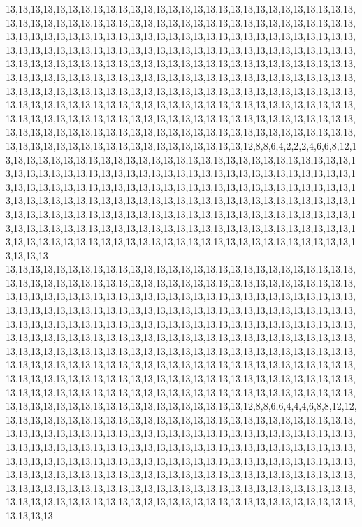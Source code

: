 13,13,13,13,13,13,13,13,13,13,13,13,13,13,13,13,13,13,13,13,13,13,13,13,13,13,13,13,13,13,13,13,13,13,13,13,13,13,13,13,13,13,13,13,13,13,13,13,13,13,13,13,13,13,13,13,13,13,13,13,13,13,13,13,13,13,13,13,13,13,13,13,13,13,13,13,13,13,13,13,13,13,13,13,13,13,13,13,13,13,13,13,13,13,13,13,13,13,13,13,13,13,13,13,13,13,13,13,13,13,13,13,13,13,13,13,13,13,13,13,13,13,13,13,13,13,13,13,13,13,13,13,13,13,13,13,13,13,13,13,13,13,13,13,13,13,13,13,13,13,13,13,13,13,13,13,13,13,13,13,13,13,13,13,13,13,13,13,13,13,13,13,13,13,13,13,13,13,13,13,13,13,13,13,13,13,13,13,13,13,13,13,13,13,13,13,13,13,13,13,13,13,13,13,13,13,13,13,13,13,13,13,13,13,13,13,13,13,13,13,13,13,13,13,13,13,13,13,13,13,13,13,13,13,13,13,13,13,13,13,13,13,13,13,13,13,13,13,13,13,13,13,13,13,13,13,13,13,13,13,13,13,13,13,13,13,13,13,13,13,13,13,13,13,13,13,13,13,13,13,13,13,13,13,13,13,13,13,13,13,13,13,13,13,13,13,13,13,13,12,8,8,6,4,2,2,2,4,6,6,8,12,13,13,13,13,13,13,13,13,13,13,13,13,13,13,13,13,13,13,13,13,13,13,13,13,13,13,13,13,13,13,13,13,13,13,13,13,13,13,13,13,13,13,13,13,13,13,13,13,13,13,13,13,13,13,13,13,13,13,13,13,13,13,13,13,13,13,13,13,13,13,13,13,13,13,13,13,13,13,13,13,13,13,13,13,13,13,13,13,13,13,13,13,13,13,13,13,13,13,13,13,13,13,13,13,13,13,13,13,13,13,13,13,13,13,13,13,13,13,13,13,13,13,13,13,13,13,13,13,13,13,13,13,13,13,13,13,13,13,13,13,13,13,13,13,13,13,13,13,13,13,13,13,13,13,13,13,13,13,13,13,13,13,13,13,13,13,13,13,13,13,13,13,13,13,13,13,13,13,13,13,13,13,13,13,13,13,13,13,13,13,13,13,13,13,13,13,13,13,13,13
13,13,13,13,13,13,13,13,13,13,13,13,13,13,13,13,13,13,13,13,13,13,13,13,13,13,13,13,13,13,13,13,13,13,13,13,13,13,13,13,13,13,13,13,13,13,13,13,13,13,13,13,13,13,13,13,13,13,13,13,13,13,13,13,13,13,13,13,13,13,13,13,13,13,13,13,13,13,13,13,13,13,13,13,13,13,13,13,13,13,13,13,13,13,13,13,13,13,13,13,13,13,13,13,13,13,13,13,13,13,13,13,13,13,13,13,13,13,13,13,13,13,13,13,13,13,13,13,13,13,13,13,13,13,13,13,13,13,13,13,13,13,13,13,13,13,13,13,13,13,13,13,13,13,13,13,13,13,13,13,13,13,13,13,13,13,13,13,13,13,13,13,13,13,13,13,13,13,13,13,13,13,13,13,13,13,13,13,13,13,13,13,13,13,13,13,13,13,13,13,13,13,13,13,13,13,13,13,13,13,13,13,13,13,13,13,13,13,13,13,13,13,13,13,13,13,13,13,13,13,13,13,13,13,13,13,13,13,13,13,13,13,13,13,13,13,13,13,13,13,13,13,13,13,13,13,13,13,13,13,13,13,13,13,13,13,13,13,13,13,13,13,13,13,13,13,13,13,13,13,13,13,13,13,13,13,13,13,13,13,13,13,13,13,13,13,13,13,13,12,8,8,6,6,4,4,4,6,8,8,12,12,13,13,13,13,13,13,13,13,13,13,13,13,13,13,13,13,13,13,13,13,13,13,13,13,13,13,13,13,13,13,13,13,13,13,13,13,13,13,13,13,13,13,13,13,13,13,13,13,13,13,13,13,13,13,13,13,13,13,13,13,13,13,13,13,13,13,13,13,13,13,13,13,13,13,13,13,13,13,13,13,13,13,13,13,13,13,13,13,13,13,13,13,13,13,13,13,13,13,13,13,13,13,13,13,13,13,13,13,13,13,13,13,13,13,13,13,13,13,13,13,13,13,13,13,13,13,13,13,13,13,13,13,13,13,13,13,13,13,13,13,13,13,13,13,13,13,13,13,13,13,13,13,13,13,13,13,13,13,13,13,13,13,13,13,13,13,13,13,13,13,13,13,13,13,13,13,13,13,13,13,13,13,13,13,13,13,13,13,13,13,13,13,13,13,13,13,13,13,13,13
